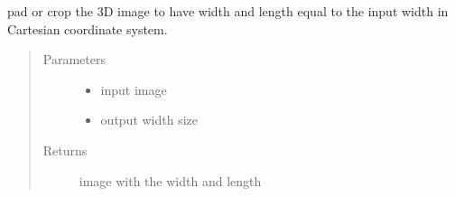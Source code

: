 \documentclass[letterpaper,10pt,english]{sphinxmanual}
\begin{document}
\begin{fulllineitems}
\label{\detokenize{index:util.load_data.im_fix_width}}
pad or crop the 3D image to have width and length equal to the input width in Cartesian coordinate system.
\begin{quote}\begin{description}
\item[{Parameters}] \leavevmode\begin{itemize}
\item {} 
 \textendash{} input image

\item {} 
 \textendash{} output width size

\end{itemize}

\item[{Returns}] \leavevmode
image with the  width and length

\end{description}\end{quote}

\end{fulllineitems}

\end{document}
